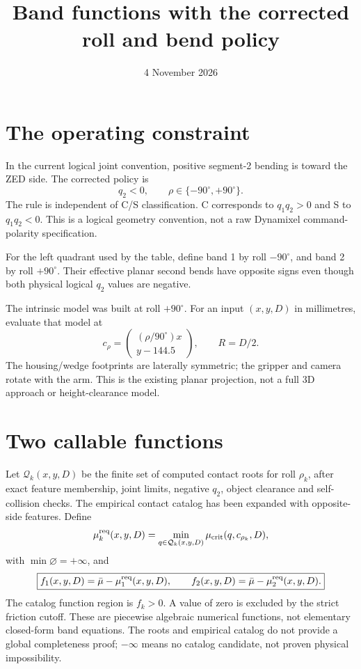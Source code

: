 \documentclass{article}
\title{Band functions with the corrected roll and bend policy}
\author{}\date{4 November 2026}
\begin{document}
\maketitle

\section{The operating constraint}
In the current logical joint convention, positive segment-2 bending is toward the ZED side. The corrected policy is
\[
\boxed{q_2<0,\qquad \rho\in\{-90^\circ,+90^\circ\}.}
\]
The rule is independent of C/S classification. C corresponds to $q_1q_2>0$ and S to $q_1q_2<0$.
This is a logical geometry convention, not a raw Dynamixel command-polarity specification.

For the left quadrant used by the table, define band 1 by roll $-90^\circ$, and band 2 by roll $+90^\circ$. Their effective planar second bends have opposite signs even though both physical logical $q_2$ values are negative.

The intrinsic model was built at roll $+90^\circ$. For an input $(x,y,D)$ in millimetres, evaluate that model at
\[
\boxed{c_\rho=\begin{pmatrix}(\rho/90^\circ)x\\ y-144.5\end{pmatrix},\qquad R=D/2.}
\]
The housing/wedge footprints are laterally symmetric; the gripper and camera rotate with the arm. This is the existing planar projection, not a full 3D approach or height-clearance model.

\section{Two callable functions}
Let $\mathcal Q_k(x,y,D)$ be the finite set of computed contact roots for roll $\rho_k$, after exact feature membership, joint limits, negative $q_2$, object clearance and self-collision checks. The empirical contact catalog has been expanded with opposite-side features. Define
\[
\mu_k^{\rm req}(x,y,D)=\min_{q\in\mathcal Q_k(x,y,D)}\mu_{\rm crit}(q,c_{\rho_k},D),
\]
with $\min\varnothing=+\infty$, and
\[
\boxed{f_1(x,y,D)=\bar\mu-\mu_1^{\rm req}(x,y,D),\qquad
f_2(x,y,D)=\bar\mu-\mu_2^{\rm req}(x,y,D).}
\]
The catalog function region is $f_k>0$. A value of zero is excluded by the strict friction cutoff. These are piecewise algebraic numerical functions, not elementary closed-form band equations. The roots and empirical catalog do not provide a global completeness proof; $-\infty$ means no catalog candidate, not proven physical impossibility.
\end{document}
